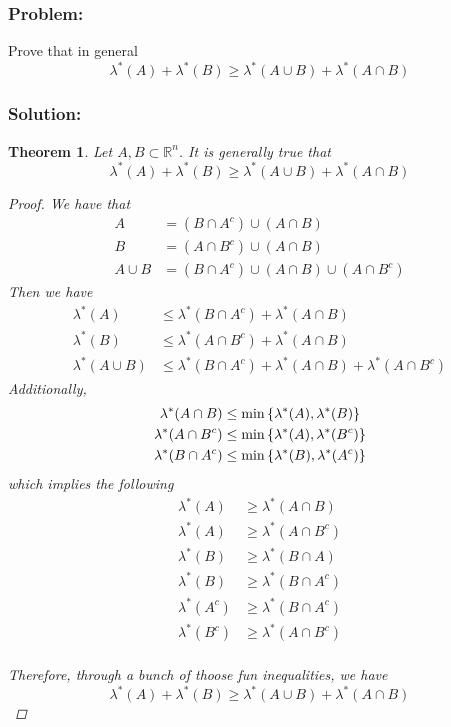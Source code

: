 \documentclass[]{article}
\newcommand{\R}{\mathbb{R}}
\newtheorem{theorem}{Theorem}
\begin{document}
\subsubsection*{Problem:}
Prove that in general \[
    \lambda^*(A) + \lambda^*(B) \geq \lambda^*(A \cup B) + \lambda^*(A \cap B)
\]
\subsubsection*{Solution:}
\begin{theorem}
    Let $A, B \subset \R^n$.
    It is generally true that\[
        \lambda^*(A) + \lambda^*(B) \geq \lambda^*(A \cup B) + \lambda^*(A \cap B)
    \] \begin{proof}
        We have that \begin{align*}
            A &= (B \cap A^c) \cup (A \cap B)\\
            B &= (A \cap B^c) \cup (A \cap B)\\
            A \cup B &= (B \cap A^c) \cup (A \cap B) \cup (A \cap B^c)
        \end{align*} Then we have \begin{align*}
            \lambda^*(A) &\leq \lambda^*(B \cap A^c) + \lambda^*(A \cap B)\\
            \lambda^*(B) &\leq \lambda^*(A \cap B^c) + \lambda^*(A \cap B)\\
            \lambda^*(A \cup B) &\leq \lambda^*(B \cap A^c) + \lambda^*(A \cap B) + \lambda^*(A \cap B^c)
        \end{align*} Additionally, \begin{align*}
            \lambda^*(A \cap B) &\leq \min \qty{\lambda^*(A), \lambda^*(B)}\\
            \lambda^*(A \cap B^c) &\leq \min \qty{\lambda^*(A), \lambda^*(B^c)}\\
            \lambda^*(B \cap A^c) &\leq \min \qty{\lambda^*(B), \lambda^*(A^c)}\\
        \end{align*} which implies the following \begin{align*}
            \lambda^*(A) &\geq \lambda^*(A \cap B)\\
            \lambda^*(A) &\geq \lambda^*(A \cap B^c)\\
            \lambda^*(B) &\geq \lambda^*(B \cap A)\\
            \lambda^*(B) &\geq \lambda^*(B \cap A^c)\\
            \lambda^*(A^c) &\geq \lambda^*(B \cap A^c)\\
            \lambda^*(B^c) &\geq \lambda^*(A \cap B^c)\\
        \end{align*}
        
        Therefore, through a bunch of thoose fun inequalities, we have \[
            \lambda^*(A) + \lambda^*(B) \geq \lambda^*(A \cup B) + \lambda^*(A \cap B)
        \]
    \end{proof}
\end{theorem}
\end{document}
